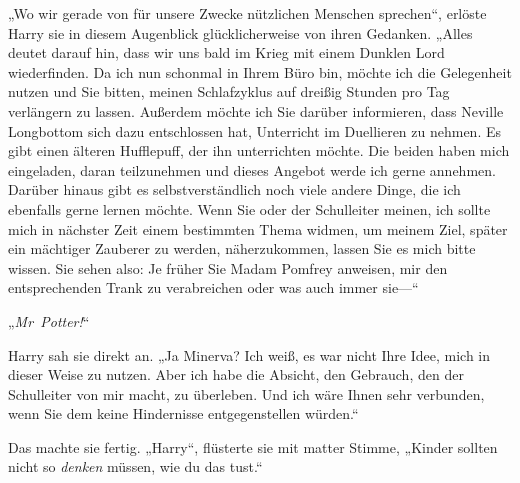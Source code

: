 „Wo wir gerade von für unsere Zwecke nützlichen Menschen sprechen“, erlöste Harry sie in diesem Augenblick glücklicherweise von ihren Gedanken. „Alles deutet darauf hin, dass wir uns bald im Krieg mit einem Dunklen Lord wiederfinden. Da ich nun schonmal in Ihrem Büro bin, möchte ich die Gelegenheit nutzen und Sie bitten, meinen Schlafzyklus auf dreißig Stunden pro Tag verlängern zu lassen. Außerdem möchte ich Sie darüber informieren, dass Neville Longbottom sich dazu entschlossen hat, Unterricht im Duellieren zu nehmen. Es gibt einen älteren Hufflepuff, der ihn unterrichten möchte. Die beiden haben mich eingeladen, daran teilzunehmen und dieses Angebot werde ich gerne annehmen.
Darüber hinaus gibt es selbstverständlich noch viele andere Dinge, die ich ebenfalls gerne lernen möchte. Wenn Sie oder der Schulleiter meinen, ich sollte mich in nächster Zeit einem bestimmten Thema widmen, um meinem Ziel, später ein mächtiger Zauberer zu werden, näherzukommen, lassen Sie es mich bitte wissen.
Sie sehen also: Je früher Sie Madam Pomfrey anweisen, mir den entsprechenden Trank zu verabreichen oder was auch immer sie—“

„\emph{Mr~Potter!}“

Harry sah sie direkt an. „Ja Minerva? Ich weiß, es war nicht Ihre Idee, mich in dieser Weise zu nutzen. Aber ich habe die Absicht, den Gebrauch, den der Schulleiter von mir macht, zu überleben. Und ich wäre Ihnen sehr verbunden, wenn Sie dem keine Hindernisse entgegenstellen würden.“

Das machte sie fertig. „Harry“, flüsterte sie mit matter Stimme, „Kinder sollten nicht so \emph{denken} müssen, wie du das tust.“

